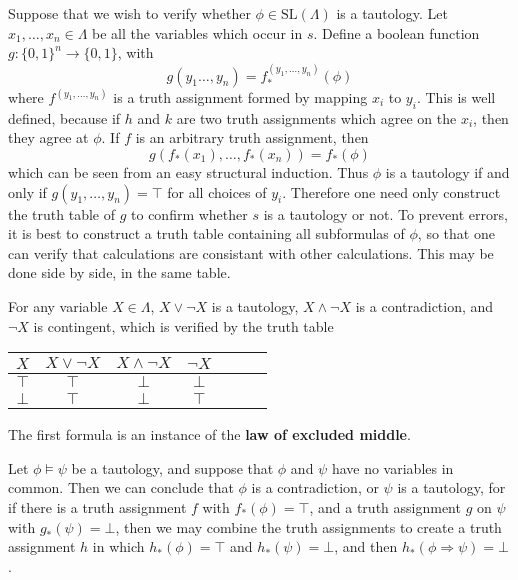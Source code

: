 Suppose that we wish to verify whether $\phi \in \text{SL}(\Lambda)$ is a tautology. Let $x_1, \dots, x_n \in \Lambda$ be all the variables which occur in $s$. Define a boolean function $g: \{ 0, 1 \}^n \to \{ 0, 1 \}$, with
%
\[ g(y_1 \dots, y_n) = f^{(y_1, \dots, y_n)}_*(\phi) \]
%
where $f^{(y_1, \dots, y_n)}$ is a truth assignment formed by mapping $x_i$ to $y_i$. This is well defined, because if $h$ and $k$ are two truth assignments which agree on the $x_i$, then they agree at $\phi$. If $f$ is an arbitrary truth assignment, then
%
\[ g(f_*(x_1), \dots, f_*(x_n)) = f_*(\phi) \]
%
which can be seen from an easy structural induction. Thus $\phi$ is a tautology if and only if $g(y_1, \dots, y_n) = \top$ for all choices of $y_i$. Therefore one need only construct the truth table of $g$ to confirm whether $s$ is a tautology or not. To prevent errors, it is best to construct a truth table containing all subformulas of $\phi$, so that one can verify that calculations are consistant with other calculations. This may be done side by side, in the same table.

\begin{example}
    For any variable $X \in \Lambda$, $X \vee \neg X$ is a tautology, $X \wedge \neg X$ is a contradiction, and $\neg X$ is contingent, which is verified by the truth table
    \begin{center}
    \begin{tabular}{| c | c | c | c | c | c | c |}
        \hline $X$ & $X \vee \neg X$ & $X \wedge \neg X$ & $\neg X$ \\
        \hline $\top$ & $\top$ & $\bot$ & $\bot$ \\
               $\bot$ & $\top$ & $\bot$ & $\top$ \\
        \hline
    \end{tabular}
    \end{center}
    The first formula is an instance of the {\bf law of excluded middle}.
\end{example}

\begin{example}
    Let $\phi \vDash \psi$ be a tautology, and suppose that $\phi$ and $\psi$ have no variables in common. Then we can conclude that $\phi$ is a contradiction, or $\psi$ is a tautology, for if there is a truth assignment $f$ with $f_*(\phi) = \top$, and a truth assignment $g$ on $\psi$ with $g_*(\psi) = \bot$, then we may combine the truth assignments to create a truth assignment $h$ in which $h_*(\phi) = \top$ and $h_*(\psi) = \bot$, and then $h_*(\phi \Rightarrow \psi) = \bot$.
\end{example}

